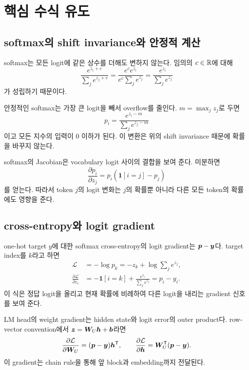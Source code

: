 \chapter{핵심 수식 유도}
\label{app:derivations}

\section{softmax의 shift invariance와 안정적 계산}

softmax는 모든 logit에 같은 상수를 더해도 변하지 않는다.
임의의 $c\in\mathbb{R}$에 대해
\begin{equation}
  \frac{e^{z_i+c}}{\sum_j e^{z_j+c}}
  =\frac{e^c e^{z_i}}{e^c\sum_j e^{z_j}}
  =\frac{e^{z_i}}{\sum_j e^{z_j}}
\end{equation}
가 성립하기 때문이다.

안정적인 softmax는 가장 큰 logit을 빼서 overflow를 줄인다.
$m=\max_j z_j$로 두면
\begin{equation}
  p_i=\frac{e^{z_i-m}}{\sum_j e^{z_j-m}}
\end{equation}
이고 모든 지수의 입력이 0 이하가 된다.
이 변환은 위의 shift invariance 때문에 확률을 바꾸지 않는다.

softmax의 Jacobian은 vocabulary logit 사이의 결합을 보여 준다.
미분하면
\begin{equation}
  \frac{\partial p_i}{\partial z_j}=p_i(\mathbf{1}[i=j]-p_j)
\end{equation}
를 얻는다.
따라서 token $j$의 logit 변화는 $j$의 확률뿐 아니라 다른 모든 token의 확률에도 영향을 준다.

\section{cross-entropy와 logit gradient}

one-hot target $y$에 대한 softmax cross-entropy의 logit gradient는 $\bm{p}-\bm{y}$다.
target index를 $k$라고 하면
\begin{align}
  \mathcal{L}&=-\log p_k
  =-z_k+\log\sum_j e^{z_j},\\
  \frac{\partial\mathcal{L}}{\partial z_i}
  &=-\mathbf{1}[i=k]+\frac{e^{z_i}}{\sum_j e^{z_j}}
  =p_i-y_i.
\end{align}
이 식은 정답 logit을 올리고 현재 확률에 비례하여 다른 logit을 내리는 gradient 신호를 보여 준다.

LM head의 weight gradient는 hidden state와 logit error의 outer product다.
row-vector convention에서 $\bm{z}=\bm{W}_U\bm{h}+\bm{b}$라면
\begin{equation}
  \frac{\partial\mathcal{L}}{\partial\bm{W}_U}
  =(\bm{p}-\bm{y})\bm{h}^{\mathsf T},\qquad
  \frac{\partial\mathcal{L}}{\partial\bm{h}}
  =\bm{W}_U^{\mathsf T}(\bm{p}-\bm{y}).
\end{equation}
이 gradient는 chain rule을 통해 앞 block과 embedding까지 전달된다.

